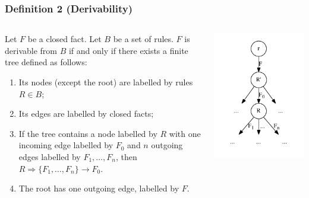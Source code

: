 \documentclass[10pt]{beamer}
\begin{document}
\begin{frame}
  \frametitle{Definition 2 (Derivability)}

  \begin{columns}
    \begin{column}{.6\textwidth}
      Let $F$ be a closed fact.
      Let $B$ be a set of rules.
      $F$ is derivable from $B$ if and only if there exists a finite tree defined as follows:
      \begin{enumerate}
        \item Its nodes (except the root) are labelled by rules $R \in B$;
        \item Its edges are labelled by closed facts;
        \item If the tree contains a node labelled by $R$ with one incoming edge labelled by $F_0$ and $n$ outgoing edges labelled by $F_1, \dots, F_n$, then $R \Rightarrow \{F_1, \dots, F_n\} \rightarrow F_0$.
        \item The root has one outgoing edge, labelled by $F$.
      \end{enumerate}
    \end{column}
    \begin{column}{.4\textwidth}
      \includegraphics[width=\textwidth]{derivation_tree}
    \end{column}
  \end{columns}
\end{frame}

{\aauwavesbg
\begin{frame}
\end{frame}}
\end{document}
